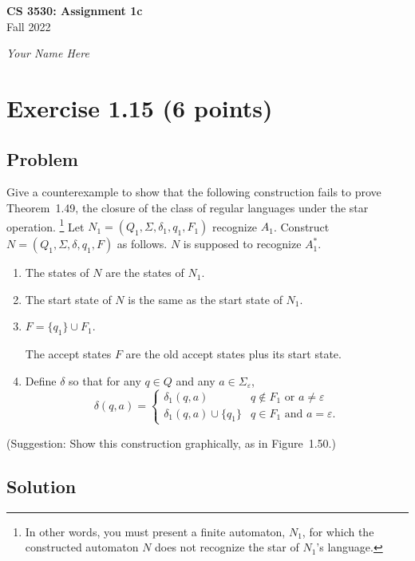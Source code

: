 \documentclass{article}
\begin{document}
\begin{empfile}

\begin{center}
\textbf{\Large CS 3530: Assignment 1c} \\[2mm]
Fall 2022

\emph{Your Name Here}
\end{center}

\raggedright

\section*{Exercise 1.15 (6 points)}

\subsection*{Problem}

Give a counterexample to show that the following construction fails
to prove Theorem~1.49, the closure of the class of regular languages
under the star operation.%
\footnote{In other words, you must present a finite automaton,
$N_1$, for which the constructed automaton $N$ does not recognize
the star of $N_1$'s language.}
Let $N_1=(Q_1,\Sigma,\delta_1,q_1,F_1)$ recognize $A_1$. Construct
$N=(Q_1,\Sigma,\delta,q_1,F)$ as follows. $N$ is supposed to
recognize $A^*_1$.

\begin{enumerate}
\renewcommand{\labelenumi}{\alph{enumi}}
\item The states of $N$ are the states of $N_1$.
\item The start state of $N$ is the same as the start state of $N_1$.
\item $F=\{q_1\}\cup F_1$.

The accept states $F$ are the old accept states plus its start state.
\item Define $\delta$ so that for any $q\in Q$ and any
$a\in\Sigma_\varepsilon$,
$$
\delta(q,a)=
\begin{cases}
\delta_1(q,a) & q\notin F_1\text{ or }a\neq\varepsilon \\
\delta_1(q,a)\cup\{q_1\} & q\in F_1\text{ and }a=\varepsilon.
\end{cases}
$$
\end{enumerate}
(Suggestion: Show this construction graphically, as in Figure~1.50.)

\subsection*{Solution}


\end{empfile}
\end{document}
